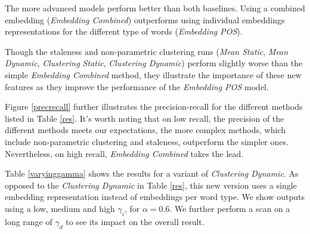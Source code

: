 \documentclass{article}
\begin{document}
The more advanced models perform better than both baselines. Using a combined embedding ({\textit{Embedding Combined}}) outperforms using individual embeddings representations for the different type of words ({\textit{Embedding POS}}).

Though the staleness and non-parametric clustering runs ({\textit{Mean Static}}, {\textit{Mean Dynamic}}, {\textit{Clustering Static}}, {\textit{Clustering Dynamic}}) perform slightly worse than the simple {\textit{Embedding Combined}} method, they illustrate the importance of these new features as they improve the performance of the {\textit{Embedding POS}} model.

Figure \ref{precrecall} further illustrates the precision-recall for the different methods listed in Table \ref{res}. It's worth noting that on low recall, the precision of the different methods meets our expectations, the more complex methods, which include non-parametric clustering and staleness, outperform the simpler ones. Nevertheless, on high recall, {\textit{Embedding Combined}} takes the lead.

Table \ref{varyinggamma} shows the results for a variant of {\textit{Clustering Dynamic}}. As opposed to the {\textit{Clustering Dynamic}} in Table \ref{res}, this new version uses a single embedding representation instead of embeddings per word type. We show outputs using a low, medium and high $\gamma_i$, for $\alpha=0.6$. We further perform a scan on a long range of $\gamma_d$ to see its impact on the overall result. 
\end{document}

